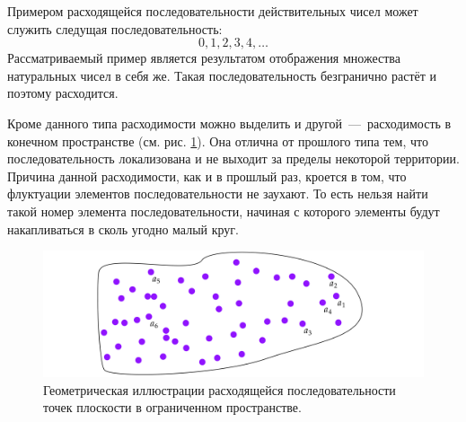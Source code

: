 \documentclass[12pt]{article}
\begin{document}
\par
Примером расходящейся последовательности действительных чисел может служить следущая последовательность:
\begin{equation}
    0,1,2,3,4,\ldots
\end{equation}
Рассматриваемый пример является результатом отображения множества натуральных чисел в себя же. Такая последовательность безгранично растёт и поэтому расходится.
\par
Кроме данного типа расходимости можно выделить и другой~\----~расходимость в конечном пространстве (см. рис. \ref{fig:3}). Она отлична от прошлого типа тем, что последовательность локализована и не выходит за пределы некоторой территории. Причина данной расходимости, как и в прошлый раз, кроется в том, что флуктуации элементов последовательности не заухают. То есть нельзя найти такой номер элемента последовательности, начиная с которого элементы будут накапливаться в сколь угодно малый круг.
\begin{figure}[ht]
    \centering
    \includegraphics[width = 1\textwidth]{fig3.png}
    \caption{Геометрическая иллюстрации расходящейся последовательности точек плоскости в ограниченном пространстве.}
    \label{fig:3}
\end{figure}
\end{document}
